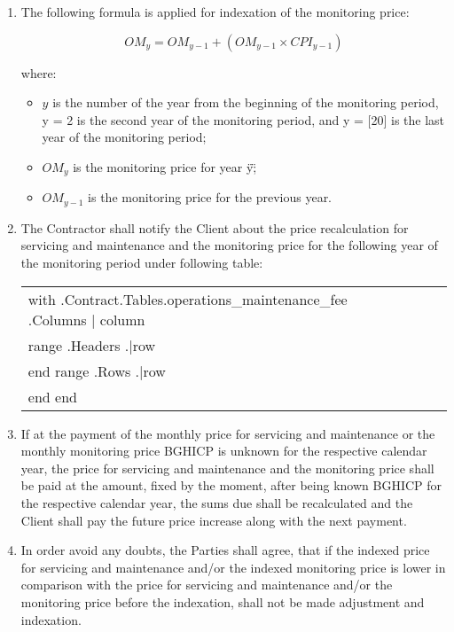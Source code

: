 \begin{enumerate}[label=\arabic*.]
	\item The following formula is applied for indexation of the monitoring price:

          \[ OM_y = OM_{y-1} + (OM_{y-1} \times CPI_{y-1}) \]

where:
\begin{itemize}
	\item $y$ is the number of the year from the beginning of the monitoring period, y = 2 is the second year of the monitoring period, and y = [20] is the last year of the monitoring period; %
	\item $OM_y$ is the monitoring price for year \"y\";
	\item $OM_{y-1}$ is the monitoring price for the previous year.
\end{itemize}


    \item The Contractor shall notify the Client about the price recalculation for servicing and maintenance and the monitoring price for the following year of the monitoring period under following table:


\begin{center}
\begin{tabu}{|X|X|X|X|X|X|} \tabucline{}
{{with .Contract.Tables.operations_maintenance_fee}} %
	{{.Columns | column}} \\\tabucline{}
	{{range .Headers}} {{.|row}} \\\tabucline{} {{end}} %
	{{range .Rows}} {{.|row}} \\\tabucline{} {{end}} %
{{end}}
\end{tabu}
\end{center}

    \item If at the payment of the monthly price for servicing and maintenance or the monthly monitoring price BGHICP is unknown for the respective calendar year, the price for servicing and maintenance and the monitoring price shall be paid at the amount, fixed by the moment, after being known BGHICP for the respective calendar year, the sums due shall be recalculated and the Client shall pay the future price increase along with the next payment.
    \item In order avoid any doubts, the Parties shall agree, that if the indexed price for servicing and maintenance and/or the indexed monitoring price is lower in comparison with the price for servicing and maintenance and/or the monitoring price before the indexation, shall not be made adjustment and indexation.

\end{enumerate}
